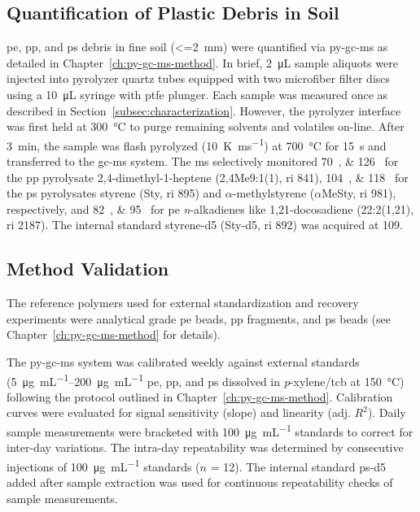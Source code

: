 \subsection{Quantification of Plastic Debris in Soil}

\ac{pe}, \ac{pp}, and \ac{ps} debris in fine soil (\SI{<=2}{\milli\meter}) were quantified via \ac{py-gc-ms} as detailed in Chapter~\ref{ch:py-gc-ms-method}.
In brief, \SI{2}{\micro\liter} sample aliquots were injected into pyrolyzer quartz tubes equipped with two microfiber filter discs using a \SI{10}{\micro\liter} syringe with \ac{ptfe} plunger.
Each sample was measured once as described in Section~\ref{subsec:characterization}. However, the pyrolyzer interface was first held at \SI{300}{\degreeCelsius} to purge remaining solvents and volatiles on-line. After \SI{3}{\minute}, the sample was flash pyrolyzed (\SI{10}{\kelvin\per\milli\second}) at \SI{700}{\degreeCelsius} for \SI{15}{\second} and transferred to the \ac{gc-ms} system. The \ac{ms} selectively monitored \SIlist{70;126}{\mz} for the \ac{pp} pyrolysate 2,4-dimethyl-1-heptene (2,4Me9:1(1), \ac{ri} \num{841}), \SIlist{104;118}{\mz} for the \ac{ps} pyrolysates styrene (Sty, \ac{ri} \num{895}) and $\alpha$-methylstyrene ($\alpha$MeSty, \ac{ri} \num{981}), respectively, and \SIlist{82;95}{\mz} for \ac{pe} \textit{n}-alkadienes like 1,21-docosadiene (22:2(1,21), \ac{ri} \num{2187}). The internal standard styrene-d5 (Sty-d5, \ac{ri} \num{892}) was acquired at \SI{109}{\mz}.

\subsection{Method Validation}

The reference polymers used for external standardization and recovery experiments were analytical grade \ac{pe} beads, \ac{pp} fragments, and \ac{ps} beads (see Chapter~\ref{ch:py-gc-ms-method} for details).

The \ac{py-gc-ms} system was calibrated weekly against external standards (\SIrange{5}{200}{\micro\gram\per\milli\liter} \ac{pe}, \ac{pp}, and \ac{ps} dissolved in \textit{p}-xylene/\ac{tcb} at \SI{150}{\degreeCelsius}) following the protocol outlined in Chapter~\ref{ch:py-gc-ms-method}. Calibration curves were evaluated for signal sensitivity (slope) and linearity (adj. $R^2$). Daily sample measurements were bracketed with \SI{100}{\micro\gram\per\milli\liter} standards to correct for inter-day variations. The intra-day repeatability was determined by consecutive injections of \SI{100}{\micro\gram\per\milli\liter} standards ($n$ = 12). The internal standard \ac{ps}-d5 added after sample extraction was used for continuous repeatability checks of sample measurements.

